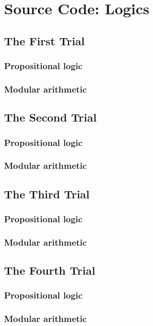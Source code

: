 \chapter{Source Code: Logics} 


\section{The First Trial}

\subsection{Propositional logic}


\subsection{Modular arithmetic}



\section{The Second Trial}

\subsection{Propositional logic}

 
\subsection{Modular arithmetic}



\section{The Third Trial} 

\subsection{Propositional logic}

 
\subsection{Modular arithmetic}



\section{The Fourth Trial} 

\subsection{Propositional logic}

 
\subsection{Modular arithmetic}

